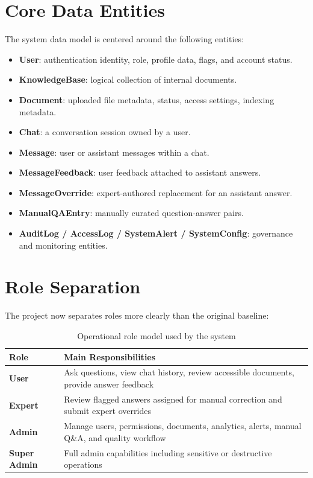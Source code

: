 \documentclass[12pt,a4paper]{report}
\begin{document}
\section{Core Data Entities}

The system data model is centered around the following entities:
\begin{itemize}[leftmargin=1.5em]
\item \textbf{User}: authentication identity, role, profile data, flags, and account status.
\item \textbf{KnowledgeBase}: logical collection of internal documents.
\item \textbf{Document}: uploaded file metadata, status, access settings, indexing metadata.
\item \textbf{Chat}: a conversation session owned by a user.
\item \textbf{Message}: user or assistant messages within a chat.
\item \textbf{MessageFeedback}: user feedback attached to assistant answers.
\item \textbf{MessageOverride}: expert-authored replacement for an assistant answer.
\item \textbf{ManualQAEntry}: manually curated question-answer pairs.
\item \textbf{AuditLog / AccessLog / SystemAlert / SystemConfig}: governance and monitoring entities.
\end{itemize}

\section{Role Separation}

The project now separates roles more clearly than the original baseline:
\begin{table}[H]
\centering
\begin{tabularx}{\textwidth}{>{\bfseries}l X}
\toprule
Role & Main Responsibilities \\
\midrule
User & Ask questions, view chat history, review accessible documents, provide answer feedback \\
Expert & Review flagged answers assigned for manual correction and submit expert overrides \\
Admin & Manage users, permissions, documents, analytics, alerts, manual Q\&A, and quality workflow \\
Super Admin & Full admin capabilities including sensitive or destructive operations \\
\bottomrule
\end{tabularx}
\caption{Operational role model used by the system}
\end{table}
\end{document}
